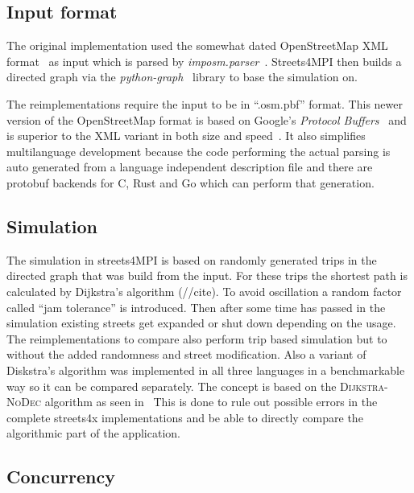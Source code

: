 \subsection*{Input format}
\label{subsec:Approach::Differences::Input}

The original implementation used the somewhat dated OpenStreetMap XML format~ as input which is parsed by \textit{imposm.parser}~. Streets4MPI then builds a directed graph via the \textit{python-graph}~ library to base the simulation on.\cite{streets_report}

The reimplementations require the input to be in ``.osm.pbf'' format. This newer version of the OpenStreetMap format is based on Google's \textit{Protocol Buffers}~ and is superior to the XML variant in both size and speed~\cite{osm_wiki_pbf}. It also simplifies multilanguage development because the code performing the actual parsing is auto generated from a language independent description file and there are protobuf backends for C, Rust and Go which can perform that generation.

\subsection*{Simulation}
\label{subsec:Approach::Differences::Simulation}

The simulation in streets4MPI is based on randomly generated trips in the directed graph that was build from the input. For these trips the shortest path is calculated by Dijkstra's algorithm (//cite). To avoid oscillation a random factor called ``jam tolerance'' is introduced. Then after some time has passed in the simulation existing streets get expanded or shut down depending on the usage. The reimplementations to compare also perform trip based simulation but to without the added randomness and street modification. Also a variant of Diskstra's algorithm was implemented in all three languages in a benchmarkable way so it can be compared separately. The concept is based on the \textsc{Dijkstra-NoDec} algorithm as seen in~\cite[p. 16]{dijkstra_utcs} This is done to rule out possible errors in the complete streets4x implementations and be able to directly compare the algorithmic part of the application.

\subsection*{Concurrency}
\label{subsec:Approach::Differences::Concurrency}

